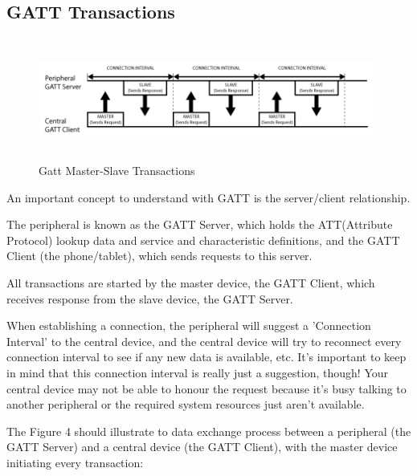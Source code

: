 \documentclass[11pt,a4paper]{article}
\begin{document}
	\subsection{GATT Transactions}
	\begin{figure}[h]
    \centering
    \includegraphics[width=11cm,height=4cm]{GattTransactions.png}
    \caption{Gatt Master-Slave Transactions}
    \end{figure}
	{An important concept to understand with GATT is the server/client relationship.

The peripheral is known as the GATT Server, which holds the ATT(Attribute Protocol) lookup data and service and characteristic definitions, and the GATT Client (the phone/tablet), which sends requests to this server.

All transactions are started by the master device, the GATT Client, which receives response from the slave device, the GATT Server.

When establishing a connection, the peripheral will suggest a 'Connection Interval' to the central device, and the central device will try to reconnect every connection interval to see if any new data is available, etc. It's important to keep in mind that this connection interval is really just a suggestion, though! Your central device may not be able to honour the request because it's busy talking to another peripheral or the required system resources just aren't available.

The Figure 4 should illustrate to data exchange process between a peripheral (the GATT Server) and a central device (the GATT Client), with the master device initiating every transaction:}

    \newpage
\end{document}
